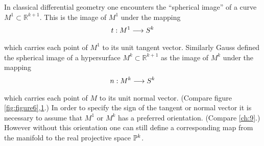 \documentclass[../main]{subfiles}
\begin{document}
In classical differential geometry one encounters the ``spherical image''
of a curve $M^1\subset \mathbb R^{k+1}$. This is the image of $M^1$ under the mapping
\[t : M^1 \varrightarrow{} S^k\]
which carries each point of $M^1$ to its unit tangent vector. Similarly Gauss defined the spherical image of a hypersurface $M^k \subset \mathbb R^{k+1}$ as the image of $M^k$ under the mapping
\[n : M^k \varrightarrow{} S^k\]
which carries each point of $M$ to its unit normal vector. (Compare figure \ref{fig:figure6},\ref{fig:figure7}.) In order to specify the sign of the tangent or normal vector it is
necessary to assume that $M^1$ or $M^k$ has a preferred orientation. (Compare
\ref{ch:9}.) However without this orientation one can still define a corresponding
map from the manifold to the real projective space $\mathbb{P}^k$.

\begin{figure}[ht]
    \centering
    \caption{}
    \label{fig:figure7}
\end{figure}
\begin{figure}[ht]
    \centering
    \caption{}
    \label{fig:figure8}
\end{figure}
\end{document}
